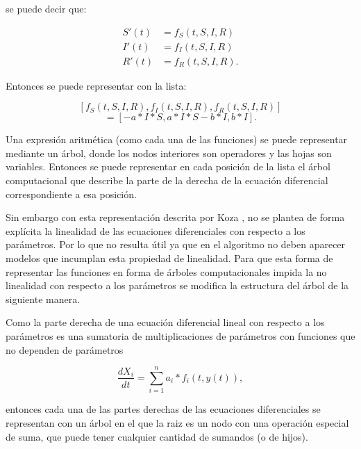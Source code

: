 se puede decir que:

\begin{align*}
    S'(t) & = f_S(t, S, I, R)  \\
    I'(t) & = f_I(t, S, I, R)  \\
    R'(t) & = f_R(t, S, I, R).
\end{align*}

Entonces se puede representar con la lista:

$$[f_S(t, S, I, R), f_I(t, S, I, R), f_R(t, S, I, R)]$$
$$= [-a*I*S, a*I*S - b*I, b*I].$$

Una expresión aritmética (como cada una de las funciones) se puede representar mediante un árbol, donde los nodos interiores son operadores y las hojas son variables. Entonces se puede representar en cada posición de la lista el árbol computacional que describe la parte de la derecha de la ecuación diferencial correspondiente a esa posición.

Sin embargo con esta representación descrita por Koza \cite{zelinka2005analytic}, no se plantea de forma explícita la linealidad de las ecuaciones diferenciales con respecto a los parámetros. Por lo que no resulta útil ya que en el algoritmo no deben aparecer modelos que incumplan esta propiedad de linealidad. Para que esta forma de representar las funciones en forma de árboles computacionales impida la no linealidad con respecto a los parámetros se modifica la estructura del árbol de la siguiente manera.

Como la parte derecha de una ecuación diferencial lineal con respecto a los parámetros es una sumatoria de multiplicaciones de parámetros con funciones que no dependen de parámetros

$$\frac{dX_i}{dt} = \sum_{i=1}^{n} a_i * f_i(t, y(t)),$$

entonces cada una de las partes derechas de las ecuaciones diferenciales se representan con un árbol en el que la raiz es un nodo con una operación especial de suma, que puede tener cualquier cantidad de sumandos (o de hijos).

\begin{center}
\end{center}


